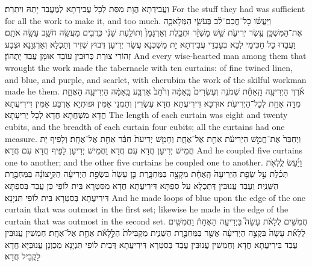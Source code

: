 {וַעֲבִידְתָא הֲוָת מִסַּת לְכָל עֲבִידְתָא לְמֶעֱבַד יָתַהּ וִיתַרַת׃}
{For the stuff they had was sufficient for all the work to make it, and too much.}{}
{וַיַּעֲשׂ֨וּ כׇל־חֲכַם־לֵ֜ב בְּעֹשֵׂ֧י הַמְּלָאכָ֛ה אֶת־הַמִּשְׁכָּ֖ן עֶ֣שֶׂר יְרִיעֹ֑ת שֵׁ֣שׁ מׇשְׁזָ֗ר וּתְכֵ֤לֶת וְאַרְגָּמָן֙ וְתוֹלַ֣עַת שָׁנִ֔י כְּרֻבִ֛ים מַעֲשֵׂ֥ה חֹשֵׁ֖ב עָשָׂ֥ה אֹתָֽם׃}
{וַעֲבַדוּ כָל חַכִּימֵי לִבָּא בְּעָבְדֵי עֲבִידְתָא יָת מַשְׁכְּנָא עֲשַׂר יְרִיעָן דְּבוּץ שְׁזִיר וְתַכְלָא וְאַרְגְּוָנָא וּצְבַע זְהוֹרִי צוּרַת כְּרוּבִין עוֹבָד אוּמָּן עֲבַד יָתְהוֹן׃}
{And every wise-hearted man among them that wrought the work made the tabernacle with ten curtains: of fine twined linen, and blue, and purple, and scarlet, with cherubim the work of the skilful workman made he them.}{}
{אֹ֜רֶךְ הַיְרִיעָ֣ה הָֽאַחַ֗ת שְׁמֹנֶ֤ה וְעֶשְׂרִים֙ בָּֽאַמָּ֔ה וְרֹ֙חַב֙ אַרְבַּ֣ע בָּֽאַמָּ֔ה הַיְרִיעָ֖ה הָאֶחָ֑ת מִדָּ֥ה אַחַ֖ת לְכׇל־הַיְרִיעֹֽת׃}
{אוּרְכָּא דִּירִיעֲתָא חֲדָא עֶשְׂרִין וְתַמְנֵי אַמִּין וּפוּתְיָא אַרְבַּע אַמִּין דִּירִיעֲתָא חֲדָא מִשְׁחֲתָא חֲדָא לְכָל יְרִיעָתָא׃}
{The length of each curtain was eight and twenty cubits, and the breadth of each curtain four cubits; all the curtains had one measure.}{}
{וַיְחַבֵּר֙ אֶת־חֲמֵ֣שׁ הַיְרִיעֹ֔ת אַחַ֖ת אֶל־אֶחָ֑ת וְחָמֵ֤שׁ יְרִיעֹת֙ חִבַּ֔ר אַחַ֖ת אֶל־אֶחָֽת׃}
{וְלָפֵיף יָת חֲמֵישׁ יְרִיעָן חֲדָא עִם חֲדָא וַחֲמֵישׁ יְרִיעָן לָפֵיף חֲדָא עִם חֲדָא׃}
{And he coupled five curtains one to another; and the other five curtains he coupled one to another.}{}
{וַיַּ֜עַשׂ לֻֽלְאֹ֣ת תְּכֵ֗לֶת עַ֣ל שְׂפַ֤ת הַיְרִיעָה֙ הָֽאֶחָ֔ת מִקָּצָ֖ה בַּמַּחְבָּ֑רֶת כֵּ֤ן עָשָׂה֙ בִּשְׂפַ֣ת הַיְרִיעָ֔ה הַקִּ֣יצוֹנָ֔ה בַּמַּחְבֶּ֖רֶת הַשֵּׁנִֽית׃}
{וַעֲבַד עֲנוּבִּין דְּתַכְלָא עַל סִפְתָּא דִּירִיעֲתָא חֲדָא מִסִּטְרָא בֵּית לוֹפֵי כֵּן עֲבַד בְּסִפְתָּא דִּירִיעֲתָא בְּסִטְרָא בֵּית לוֹפִי תִּנְיָנָא׃}
{And he made loops of blue upon the edge of the one curtain that was outmost in the first set; likewise he made in the edge of the curtain that was outmost in the second set.}{}
{חֲמִשִּׁ֣ים לֻלָאֹ֗ת עָשָׂה֮ בַּיְרִיעָ֣ה הָאֶחָת֒ וַחֲמִשִּׁ֣ים לֻלָאֹ֗ת עָשָׂה֙ בִּקְצֵ֣ה הַיְרִיעָ֔ה אֲשֶׁ֖ר בַּמַּחְבֶּ֣רֶת הַשֵּׁנִ֑ית מַקְבִּילֹת֙ הַלֻּ֣לָאֹ֔ת אַחַ֖ת אֶל־אֶחָֽת׃}
{חַמְשִׁין עֲנוּבִּין עֲבַד בִּירִיעֲתָא חֲדָא וְחַמְשִׁין עֲנוּבִּין עֲבַד בְּסִטְרָא דִּירִיעֲתָא דְּבֵית לוֹפֵי תִּנְיָנָא מַכְוְנָן עֲנוּבַּיָּא חֲדָא לָקֳבֵיל חֲדָא׃}
